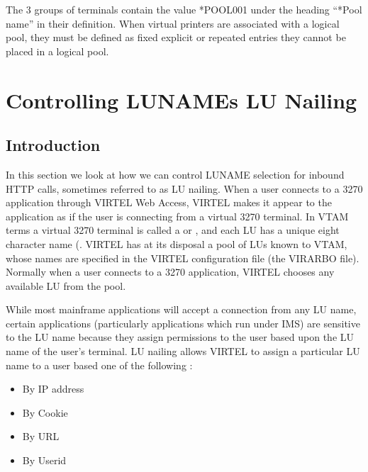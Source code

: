 \documentclass[letterpaper,10pt,english]{sphinxmanual}
\begin{document}
\sphinxAtStartPar
The 3 groups of terminals contain the value *POOL001 under the heading “*Pool name” in their definition. When virtual printers are associated with a logical pool, they must be defined as fixed explicit or repeated entries \textendash{} they cannot be placed in a logical pool.

\ignorespaces 

\chapter{Controlling LUNAMEs \sphinxhyphen{} LU Nailing}
\label{\detokenize{connectivity_guide:controlling-lunames-lu-nailing}}\label{\detokenize{connectivity_guide:v462cn-forceluname}}\label{\detokenize{connectivity_guide:index-152}}

\section{Introduction}
\label{\detokenize{connectivity_guide:id74}}
\sphinxAtStartPar
In this section we look at how we can control LUNAME selection for inbound HTTP calls, sometimes referred to as LU nailing. When a user connects to a 3270 application through VIRTEL Web Access, VIRTEL makes it appear to the application as if the user is connecting from a virtual 3270 terminal. In VTAM terms a virtual 3270 terminal is called a  or , and each LU has a unique eight character name (. VIRTEL has at its disposal a pool of LUs known to VTAM, whose names are specified in the VIRTEL configuration file (the VIRARBO file). Normally when a user connects to a 3270 application, VIRTEL chooses any available LU from the pool.

\sphinxAtStartPar
While most mainframe applications will accept a connection from any LU name, certain applications (particularly applications which run under IMS) are sensitive to the LU name because they assign permissions to the user based upon the LU name of the user’s terminal. LU nailing allows VIRTEL to assign a particular LU name to a user based one of the following :\sphinxhyphen{}
\begin{itemize}
\item {} 
\sphinxAtStartPar
By IP address

\item {} 
\sphinxAtStartPar
By Cookie

\item {} 
\sphinxAtStartPar
By URL

\item {} 
\sphinxAtStartPar
By Userid

\end{itemize}
\end{document}
